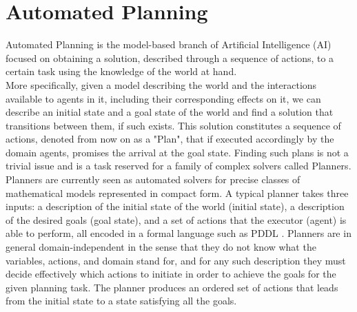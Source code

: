 \section{Automated Planning}
\label{background: automated}
Automated Planning is the model-based branch of Artificial Intelligence (AI) focused on obtaining a solution, described through a sequence of actions, to a certain task using the knowledge of the world at hand.\\
More specifically, given a model describing the world and the interactions available to agents in it, including their corresponding effects on it, we can describe an initial state and a goal state of the world and find a solution that transitions between them, if such exists. This solution constitutes a sequence of actions, denoted from now on as a "Plan", that if executed accordingly by the domain agents, promises the arrival at the goal state. Finding such plans is not a trivial issue and is a task reserved for a family of complex solvers called Planners.\\
Planners are currently seen as automated solvers for precise classes of mathematical models represented in compact form. A typical planner takes three inputs: a description of the initial state of the world (initial state), a description of the desired goals (goal state), and a set of actions that the executor (agent) is able to perform, all encoded in a formal language such as PDDL \cite{PDDL}. 
Planners are in  general domain-independent in the sense that they do not know what the variables, actions, and domain stand for, and for any such description they must decide effectively which actions to initiate in order to achieve the goals for the given planning task. The planner produces an ordered set of actions that leads from the initial state to a state satisfying all the goals. 


